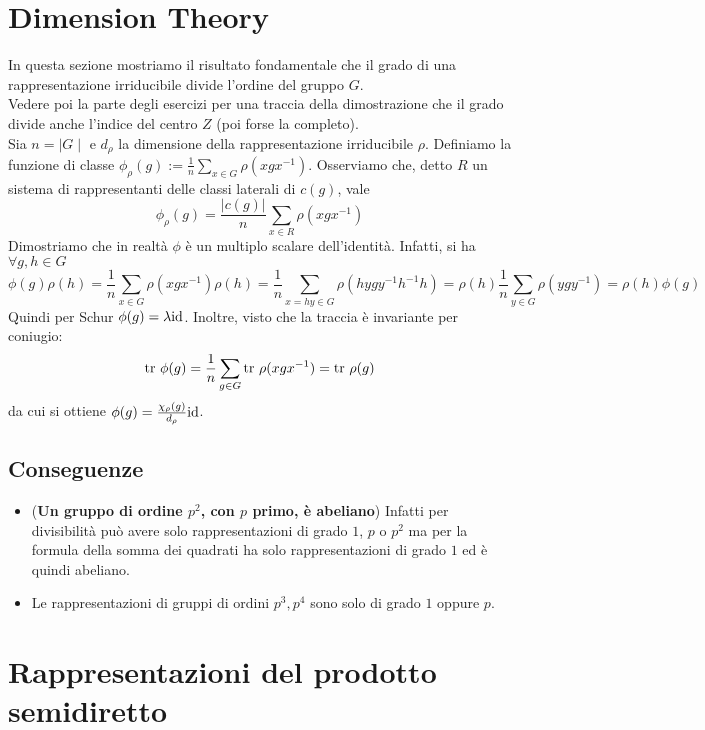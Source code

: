 \documentclass[a4paper,NoNotes,GeneralMath]{stdmdoc}
\begin{document}
	\section{Dimension Theory}
	In questa sezione mostriamo il risultato fondamentale che il grado di una rappresentazione irriducibile divide l'ordine del gruppo $G$.  \\
	Vedere poi la parte degli esercizi per una traccia della dimostrazione che il grado divide anche l'indice del centro $Z$ (poi forse la completo). \\
	Sia $n = \mid G \mid$ e $d_\rho$ la dimensione della rappresentazione irriducibile $\rho$. Definiamo la funzione di classe $\phi_\rho(g) := \frac{1}{n} \sum_{x \in G} \rho(xgx^{-1})$.
	Osserviamo che, detto $R$ un sistema di rappresentanti delle classi laterali di $c(g)$, vale
	$$ \phi_\rho(g) = \frac{ |c(g)|}{n} \sum_{x \in R} \rho(xgx^{-1}) $$
	Dimostriamo che in realtà $\phi$ è un multiplo scalare dell'identità. Infatti, si ha $\forall g,h \in G$
	$$ \phi(g) \rho(h) = \frac{1}{n} \sum_{x \in G} \rho(xgx^{-1}) \rho(h) = \frac{1}{n} \sum_{x =hy \in G} \rho(hygy^{-1}h^{-1} h) = \rho(h) \frac{1}{n} \sum_{y \in G} \rho(ygy^{-1}) = \rho(h) \phi(g) $$ 
	Quindi per Schur $\phi(g) = \lambda \mbox{id} $. Inoltre, visto che la traccia è invariante per coniugio:
	$$ \mbox{tr } \phi(g) = \frac{1}{n}  \sum_{g \in G} \mbox{tr } \rho(xgx^{-1})  = \mbox{tr } \rho(g) $$
	da cui si ottiene $\phi(g) = \frac{\chi_\rho(g)}{d_\rho } \mbox{id} $. 

	\subsection{Conseguenze}
	\begin{itemize}
		\item ({\bf Un gruppo di ordine $p^2$, con $p$ primo, è abeliano}) Infatti per divisibilità può avere solo rappresentazioni di grado $1$, $p$ o $p^2$ ma per la formula della somma dei quadrati ha solo rappresentazioni di grado $1$ ed è quindi abeliano.
		\item Le rappresentazioni di gruppi di ordini $p^3, p^4$ sono solo di grado $1$ oppure $p$.
	\end{itemize}

	\section{Rappresentazioni del prodotto semidiretto}
\end{document}
